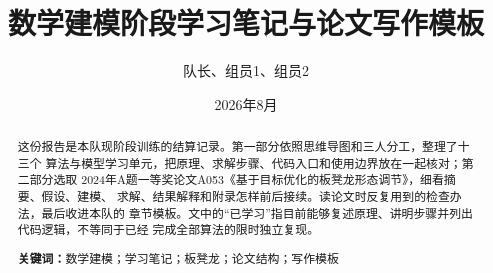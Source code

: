 \documentclass[UTF8,zihao=-4]{ctexart}
\title{\bfseries 数学建模阶段学习笔记与论文写作模板}
\author{队长、组员1、组员2}
\date{2026年8月}
\begin{document}
\maketitle

\begin{abstract}
这份报告是本队现阶段训练的结算记录。第一部分依照思维导图和三人分工，整理了十三个
算法与模型学习单元，把原理、求解步骤、代码入口和使用边界放在一起核对；第二部分选取
2024年A题一等奖论文A053《基于目标优化的板凳龙形态调节》，细看摘要、假设、建模、
求解、结果解释和附录怎样前后接续。读论文时反复用到的检查办法，最后收进本队的
章节模板。文中的“已学习”指目前能够复述原理、讲明步骤并列出代码逻辑，不等同于已经
完成全部算法的限时独立复现。

\par\noindent\textbf{关键词：}数学建模；学习笔记；板凳龙；论文结构；写作模板
\end{abstract}

\tableofcontents
\newpage
\end{document}
